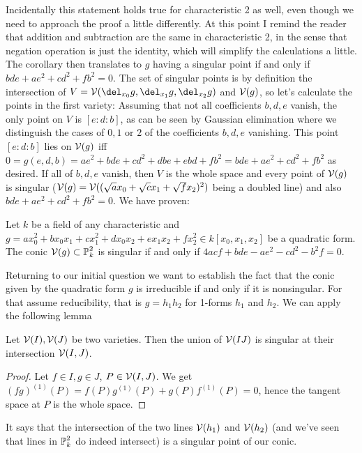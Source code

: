 Incidentally this statement holds true for characteristic 2 as well, even though we need to approach the proof a little differently.
At this point I remind the reader that addition and subtraction are the same in characteristic 2, in the sense that negation operation is just the identity, which will simplify the calculations a little.
The corollary then translates to $g$ having a singular point if and only if $bde +ae^2 + cd^2 +fb^2 = 0$.
The set of singular points is by definition the intersection of $V = \V(\del_{x_0}g,\del_{x_1}g,\del_{x_2}g)$ and $\operatorname{\mathcal V}(g)$, so let's calculate the points in the first variety: Assuming that not all coefficients $b,d,e$ vanish, the only point on $V$ is $[e:d:b]$, as can be seen by Gaussian elimination where we distinguish the cases of $0,1$ or $2$ of the coefficients $b,d,e$ vanishing.
This point $[e:d:b]$ lies on $\operatorname{\mathcal V}(g)$ iff $0 = g(e,d,b) = ae^2 + bde + cd^2 + dbe + ebd + fb^2 = bde + ae^2 + cd^2 + fb^2$ as desired.
If all of $b,d,e$ vanish, then $V$ is the whole space and every point of $\operatorname{\mathcal V}(g)$ is singular ($\operatorname{\mathcal V}(g) = \operatorname{\mathcal V}((\sqrt{a}x_0 + \sqrt{c}x_1 + \sqrt{f}x_2)^2)$ being a doubled line) and also $bde + ae^2 + cd^2 + fb^2 = 0$. We have proven:

\begin{corollary} \label{corollarySingularConic}
Let $k$ be a field of any characteristic and $g = ax_0^2 + bx_0x_1 + cx_1^2 + dx_0x_2 + ex_1x_2 + fx_2^2
 \in k[x_0,x_1,x_2]$ be a quadratic form. The conic $\operatorname{\mathcal V}(g) \subset \operatorname{\mathbb P}^2_k$ is singular if and only if $4acf + bde - ae^2 - cd^2 - b^2f = 0$.
\end{corollary}


Returning to our initial question we want to establish the fact that the conic given by the quadratic form $g$ is irreducible if and only if it is nonsingular.
For that assume reducibility, that is $g = h_1h_2$ for 1-forms $h_1$ and $h_2$.
We can apply the following lemma
\begin{lemma} \label{lemmaSingularIntersect}
Let $\operatorname{\mathcal V}(I),\operatorname{\mathcal V}(J)$ be two varieties. Then the union of $\operatorname{\mathcal V}(IJ)$ is singular at their intersection $\operatorname{\mathcal V}(I,J)$.
\end{lemma}
\begin{proof}
Let $f\in I, g\in J$, $P\in \operatorname{\mathcal V}(I,J)$. We get $(fg)^{(1)}(P) = f(P)g^{(1)}(P) + g(P)f^{(1)}(P) = 0$, hence the tangent space at $P$ is the whole space.
\end{proof}
It says that the intersection of the two lines $\operatorname{\mathcal V}(h_1)$ and $\operatorname{\mathcal V}(h_2)$ (and we've seen that lines in $\operatorname{\mathbb P}^2_k$ do indeed intersect) is a singular point of our conic.

